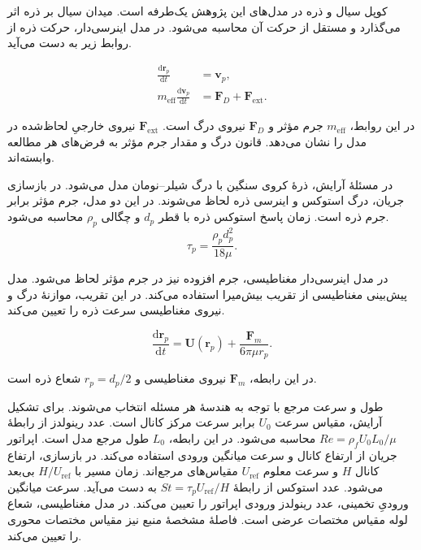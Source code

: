 کوپل سیال و ذره در مدل‌های این پژوهش یک‌طرفه است.
میدان سیال بر ذره اثر می‌گذارد و مستقل از حرکت آن محاسبه می‌شود.
در مدل اینرسی‌دار، حرکت ذره از روابط زیر به دست می‌آید.

\begin{equation}
\begin{aligned}
\frac{\mathrm d\mathbf r_p}{\mathrm dt} &= \mathbf v_p,\\
m_{\mathrm{eff}}\frac{\mathrm d\mathbf v_p}{\mathrm dt}
&= \mathbf F_D+\mathbf F_{\mathrm{ext}} .
\end{aligned}
\label{eq:theory-particle-motion}
\end{equation}

در این روابط، $m_{\mathrm{eff}}$ جرم مؤثر و $\mathbf F_D$ نیروی درگ است.
$\mathbf F_{\mathrm{ext}}$ نیروی خارجیِ لحاظ‌شده در مدل را نشان می‌دهد.
قانون درگ و مقدار جرم مؤثر به فرض‌های هر مطالعه وابسته‌اند.

در مسئلهٔ آرایش، ذرهٔ کروی سنگین با درگ شیلر–نومان مدل می‌شود.
در بازسازی جریان، درگ استوکس و اینرسی ذره لحاظ می‌شوند.
در این دو مدل، جرم مؤثر برابر جرم ذره است.
زمان پاسخ استوکس ذره با قطر $d_p$ و چگالی $\rho_p$ محاسبه می‌شود.
\begin{equation}
\tau_p=\frac{\rho_p d_p^2}{18\mu}.
\label{eq:theory-stokes-relaxation}
\end{equation}

در مدل اینرسی‌دار مغناطیسی، جرم افزوده نیز در جرم مؤثر لحاظ می‌شود.
مدل پیش‌بینی مغناطیسی از تقریب بیش‌میرا استفاده می‌کند.
در این تقریب، موازنهٔ درگ و نیروی مغناطیسی سرعت ذره را تعیین می‌کند.

\begin{equation}
\frac{\mathrm d\mathbf r_p}{\mathrm dt}
=\mathbf U(\mathbf r_p)+\frac{\mathbf F_m}{6\pi\mu r_p}.
\label{eq:theory-overdamped-motion}
\end{equation}

در این رابطه، $\mathbf F_m$ نیروی مغناطیسی و $r_p=d_p/2$ شعاع ذره است.


طول و سرعت مرجع با توجه به هندسهٔ هر مسئله انتخاب می‌شوند.
برای تشکیل آرایش، مقیاس سرعت $U_0$ برابر سرعت مرکز کانال است.
عدد رینولدز از رابطهٔ $Re=\rho_f U_0 L_0/\mu$ محاسبه می‌شود.
در این رابطه، $L_0$ طول مرجع مدل است.
اپراتور جریان از ارتفاع کانال و سرعت میانگین ورودی استفاده می‌کند.
در بازسازی، ارتفاع کانال $H$ و سرعت معلوم $U_{\mathrm{ref}}$ مقیاس‌های مرجع‌اند.
زمان مسیر با $H/U_{\mathrm{ref}}$ بی‌بعد می‌شود.
عدد استوکس از رابطهٔ $St=\tau_p U_{\mathrm{ref}}/H$ به دست می‌آید.
سرعت میانگین ورودیِ تخمینی، عدد رینولدز ورودی اپراتور را تعیین می‌کند.
در مدل مغناطیسی، شعاع لوله مقیاس مختصات عرضی است.
فاصلهٔ مشخصهٔ منبع نیز مقیاس مختصات محوری را تعیین می‌کند.

